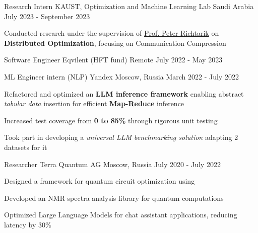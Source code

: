 
\begin{cventries}
  \cventry
    {Research Intern}
    {KAUST, Optimization and Machine Learning Lab}
    {Saudi Arabia}
    {July 2023 - September 2023}
    {
      \begin{cvitems}
        \item Conducted research under the supervision of  \href{https://richtarik.org/}{Prof. Peter Richtarik} on \textbf{Distributed Optimization}, focusing on Communication Compression
      \end{cvitems}
    }

  \cventry
    {Software Engineer}
    {Eqvilent (HFT fund)}
    {Remote}
    {July 2022 - May 2023}
    {}

  \cventry
    {ML Engineer intern (NLP)}
    {Yandex}
    {Moscow, Russia}
    {March 2022 - July 2022}
    {
      \begin{cvitems} %
        \item {Refactored and optimized an \textbf{LLM inference framework} 
        enabling abstract \textit{tabular data} insertion for efficient \textbf{Map-Reduce} inference}
        \item {Increased test coverage from \textbf{0 to 85\%} through rigorous unit testing}
        \item {Took part in developing a \textit{universal LLM benchmarking solution} adapting 2 datasets for it}
      \end{cvitems}
    }
    
  \cventry
    {Researcher} %
    {Terra Quantum AG} %
    {Moscow, Russia} %
    {July 2020 - July 2022} %
    {
      \begin{cvitems} %
        \item {Designed a framework for quantum circuit optimization using}
        \item {Developed an NMR spectra analysis library for quantum computations}
        \item {Optimized Large Language Models for chat assistant applications, reducing latency by 30\%}
      \end{cvitems}
    }
    
\end{cventries}
